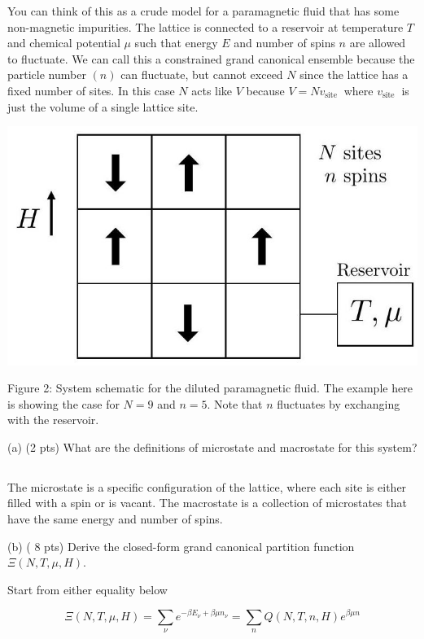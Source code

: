 \documentclass[12pt]{article}
\begin{document}
You can think of this as a crude model for a paramagnetic fluid that has some non-magnetic impurities. The lattice is connected to a reservoir at temperature $T$ and chemical potential $\mu$ such that energy $E$ and number of spins $n$ are allowed to fluctuate. We can call this a constrained grand canonical ensemble because the particle number $(n)$ can fluctuate, but cannot exceed $N$ since the lattice has a fixed number of sites. In this case $N$ acts like $V$ because $V=N v_{\text {site }}$ where $v_{\text {site }}$ is just the volume of a single lattice site.

\begin{center}
\includegraphics[max width=\textwidth]{2024_02_03_75704bce2caff28cbfb1g-3}
\end{center}

Figure 2: System schematic for the diluted paramagnetic fluid. The example here is showing the case for $N=9$ and $n=5$. Note that $n$ fluctuates by exchanging with the reservoir.

(a) (2 pts) What are the definitions of microstate and macrostate for this system?
\subsection{}
The microstate is a specific configuration of the lattice, where each site is either filled with a spin or is vacant. The macrostate is a collection of microstates that have the same energy and number of spins.

(b) ( 8 pts) Derive the closed-form grand canonical partition function $\Xi(N, T, \mu, H)$.

Start from either equality below

$$
\Xi(N, T, \mu, H)=\sum_{\nu} e^{-\beta E_{\nu}+\beta \mu n_{\nu}}=\sum_{n} Q(N, T, n, H) e^{\beta \mu n}
$$
\end{document}
